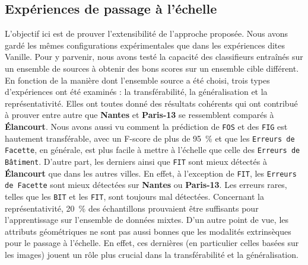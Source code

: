     \subsection*{Expériences de passage à l'échelle}
        L'objectif ici est de prouver l'extensibilité de l'approche proposée.
        Nous avons gardé les mêmes configurations expérimentales que dans les expériences dites Vanille.
        Pour y parvenir, nous avons testé la capacité des classifieurs entraînés sur un ensemble de sources à obtenir des bons scores sur un ensemble cible différent.
        En fonction de la manière dont l'ensemble source a été choisi, trois types d'expériences ont été examinés : la transférabilité, la généralisation et la représentativité.
        Elles ont toutes donné des résultats cohérents qui ont contribué à prouver entre autre que \textbf{Nantes} et \textbf{Paris-13} se ressemblent comparés à \textbf{\'Elancourt}.
        Nous avons aussi vu comment la prédiction de \texttt{FOS} et des \texttt{FIG} est hautement transférable, avec un F-score de plus de \SI{95}{\percent} et que les \texttt{Erreurs de Facette}, en générale, est plus facile à mettre à l'échelle que celle des \texttt{Erreurs de Bâtiment}.
        D'autre part, les derniers ainsi que \texttt{FIT} sont mieux détectés à \textbf{\'Elancourt} que dans les autres villes.
        En effet, à l'exception de \texttt{FIT}, les \texttt{Erreurs de Facette} sont mieux détectées sur \textbf{Nantes} ou \textbf{Paris-13}.
        Les erreurs rares, telles que les \texttt{BIT} et les \texttt{FIT}, sont toujours mal détectées.
        Concernant la représentativité, \SI{20}{\percent} des échantillons prouvaient être suffisants pour l'apprentissage sur l'ensemble de données mixtes.
        D'un autre point de vue, les attributs géométriques ne sont pas aussi bonnes que les modalités extrinsèques pour le passage à l'échelle.
        En effet, ces dernières (en particulier celles basées sur les images) jouent un rôle plus crucial dans la transférabilité et la généralisation.

